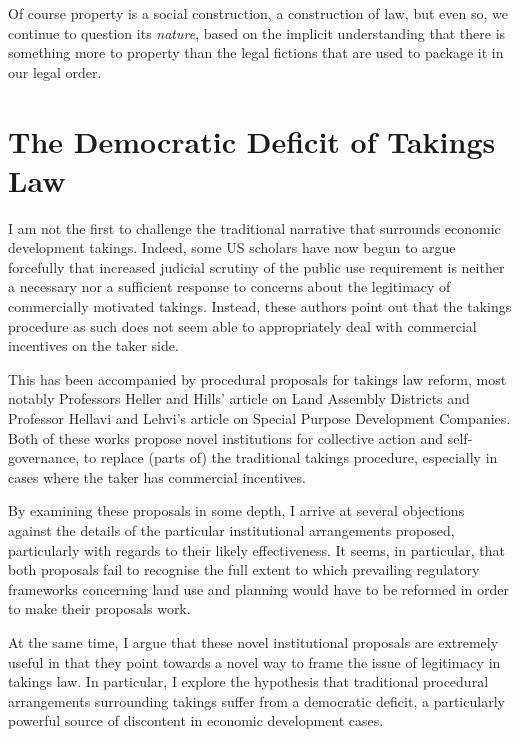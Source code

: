 {Of course property is a social construction, a construction of law, but even so, we continue to question its {\it nature}, based on the implicit understanding that there is something more to property than the legal fictions that are used to package it in our legal order.
}

\section{The Democratic Deficit of Takings Law}

I am not the first to challenge the traditional narrative that surrounds economic development takings. Indeed, some US scholars have now begun to argue forcefully that increased judicial scrutiny of the public use requirement is neither a necessary nor a sufficient response to concerns about the legitimacy of commercially motivated takings. Instead, these authors point out that the takings procedure as such does not seem able to appropriately deal with commercial incentives on the taker side.

This has been accompanied by procedural proposals for takings law reform, most notably Professors Heller and Hills' article on Land Assembly Districts and Professor Hellavi and Lehvi's article on Special Purpose Development Companies. Both of these works propose novel institutions for collective action and self-governance, to replace (parts of) the traditional takings procedure, especially in cases where the taker has commercial incentives.

By examining these proposals in some depth, I arrive at several objections against the details of the particular institutional arrangements proposed, particularly with regards to their likely effectiveness. It seems, in particular, that both proposals fail to recognise the full extent to which prevailing regulatory frameworks concerning land use and planning would have to be reformed in order to make their proposals work.

At the same time, I argue that these novel institutional proposals are extremely useful in that they point towards a novel way to frame the issue of legitimacy in takings law. In particular, I explore the hypothesis that traditional procedural arrangements surrounding takings suffer from a democratic deficit, a particularly powerful source of discontent in economic development cases.

